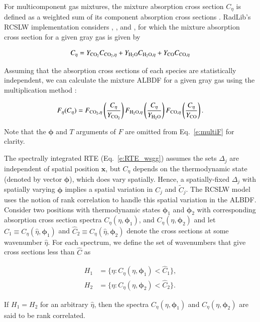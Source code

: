 \documentclass[preprint,12pt]{elsarticle}
\newcommand{\BS}{\boldsymbol}
\begin{document}
For multicomponent gas mixtures, the mixture absorption cross section $C_{\eta}$ is defined as a weighted sum of its component absorption cross sections \cite{Solovjov_2000}. RadLib's RCSLW implementation considers , , and , for which the mixture absorption cross section for a given gray gas is given by 
%
\begin{linenomath}
	\begin{equation} \label{e:multiC}
		C_{\eta} = Y_{\ce{CO2}}C_{\ce{CO2},\eta} + Y_{\ce{H2O}}C_{\ce{H2O},\eta} + Y_{\ce{CO}}C_{\ce{CO},\eta}
	\end{equation}
\end{linenomath}
%
Assuming that the absorption cross sections of each species are statistically independent, we can calculate the mixture ALBDF for a given gray gas using the multiplication method \cite{Solovjov_2000}:
%
\begin{linenomath}
\begin{equation} \label{e:multiF}
    F_{\eta}(C_{\eta}) = F_{\ce{CO2},\eta} \left( \frac{C_{\eta}}{Y_{\ce{CO2}}} \right) F_{\ce{H2O},\eta} \left( \frac{C_{\eta}}{Y_{\ce{H2O}}} \right) F_{\ce{CO},\eta} \left( \frac{C_{\eta}}{Y_{\ce{CO}}} \right). 
\end{equation}
\end{linenomath}
%
Note that the $\BS{\phi}$ and $T$ arguments of $F$ are omitted from Eq.~\ref{e:multiF} for clarity.

The spectrally integrated RTE (Eq.~\ref{e:RTE_wsgg}) assumes the sets $\Delta_j$ are independent of spatial position $\mathbf{x}$, but $C_\eta$ depends on the thermodynamic state (denoted by vector $\BS{\phi}$), which does vary spatially.
Hence, a spatially-fixed $\Delta_j$ with spatially varying $\BS{\phi}$ implies a spatial variation in $C_j$ and $\tilde{C}_j$. 
The RCSLW model uses the notion of rank correlation to handle  this spatial variation in the ALBDF. 
Consider two positions with thermodynamic states $\BS{\phi}_1$ and $\BS{\phi}_2$ with corresponding absorption cross section spectra $C_\eta(\eta,\BS{\phi}_1)$, and $C_\eta(\eta,\BS{\phi}_2)$ and let $\hat{C}_1\equiv C_\eta(\hat{\eta},\BS{\phi}_1)$ and $\hat{C}_2\equiv C_\eta(\hat{\eta},\BS{\phi}_2)$ denote the cross sections at some wavenumber $\hat{\eta}$. For each spectrum, we define the set of wavenumbers that give cross sections less than $\hat{C}$ as
%
\begin{linenomath}
\begin{align}
    H_1&=\{\eta: C_\eta(\eta,\BS{\phi}_1)<\hat{C}_1\}, \\
    H_2&=\{\eta: C_\eta(\eta,\BS{\phi}_2)<\hat{C}_2\}.
    \end{align}
\end{linenomath}
%
If $H_1=H_2$ for an arbitrary $\hat{\eta}$, then the spectra $C_\eta(\eta,\BS{\phi}_1)$ and $C_\eta(\eta,\BS{\phi}_2)$ are said to be rank correlated.
\end{document}
